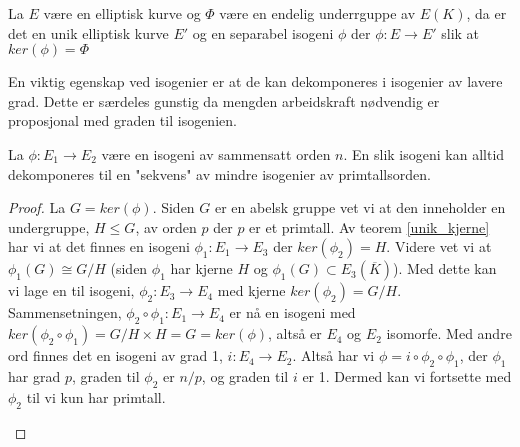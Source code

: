 \begin{teorem}
\label{unik_kjerne}
La $E$ være en elliptisk kurve og $\Phi$ være en endelig underrguppe av $E(K)$, da er det en unik elliptisk kurve $E'$ og en separabel isogeni $\phi$ der $\phi: E \rightarrow E'$ slik at $ker(\phi) = \Phi$

\cite[6.10]{sutherland-notes}
\end{teorem}

En viktig egenskap ved isogenier er at de kan dekomponeres i isogenier av lavere grad. Dette er særdeles gunstig da mengden arbeidskraft nødvendig er proposjonal med graden til isogenien.

\begin{korollar}
\label{isogeni_dekomponering}
La $\phi: E_1 \rightarrow E_2$ være en isogeni av sammensatt orden $n$. En slik isogeni kan alltid dekomponeres til en "sekvens" av mindre isogenier av primtallsorden.

\begin{proof}
La $G = ker(\phi)$. Siden $G$ er en abelsk gruppe vet vi at den inneholder en undergruppe, $H \leq G$, av orden $p$ der $p$ er et primtall. Av teorem \ref{unik_kjerne} har vi at det finnes en isogeni $\phi_1: E_1 \rightarrow E_3$ der $ker(\phi_2) = H$. Videre vet vi at $\phi_1(G) \cong G/H$ (siden $\phi_1$ har kjerne $H$ og $\phi_1(G) \subset E_3(\overline{K})$). Med dette kan vi lage en til isogeni, $\phi_2 : E_3 \rightarrow E_4$ med kjerne $ker(\phi_2) = G/H$. Sammensetningen, $\phi_2 \circ \phi_1: E_1 \rightarrow E_4$ er nå en isogeni med $ker(\phi_2 \circ \phi_1) = G/H \times H = G = ker(\phi)$, altså er $E_4$ og $E_2$ isomorfe. Med andre ord finnes det en isogeni av grad 1, $i: E_4 \rightarrow E_2$. Altså har vi $\phi = i \circ \phi_2 \circ \phi_1$, der $\phi_1$ har grad $p$, graden til $\phi_2$ er $n/p$, og graden til $i$ er 1. Dermed kan vi fortsette med $\phi_2$ til vi kun har primtall.

\begin{figure}[h!]
    \centering
{}
\end{figure}
\end{proof}
\end{korollar}

